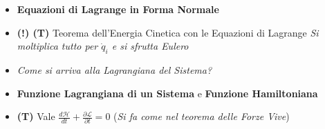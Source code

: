 \documentclass[11pt,a4paper,twoside]{article}
\begin{document}
\begin{itemize}
	\item \textbf{Equazioni di Lagrange in Forma Normale}
	\item \textbf{(!) (T)} Teorema dell'Energia Cinetica con le Equazioni di Lagrange \textit{Si moltiplica tutto per $\dot q_i$ e si sfrutta Eulero}
	\item \textit{Come si arriva alla Lagrangiana del Sistema?}
	\item \textbf{Funzione Lagrangiana di un Sistema} e \textbf{Funzione Hamiltoniana}
	\item \textbf{(T)} Vale $\frac{d\mathcal H}{dt} + \frac{\partial \mathcal L}{\partial t}=0$ (\textit{Si fa come nel teorema delle Forze Vive})
\end{itemize}
\end{document}
